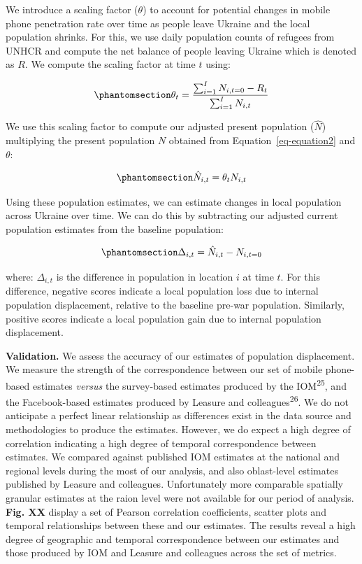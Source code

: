 \documentclass[
  11pt,
]{article}
\begin{document}
We introduce a scaling factor (\(\theta\)) to account for potential
changes in mobile phone penetration rate over time as people leave
Ukraine and the local population shrinks. For this, we use daily
population counts of refugees from UNHCR and compute the net balance of
people leaving Ukraine which is denoted as \(R\). We compute the scaling
factor at time \(t\) using:

\begin{equation}\phantomsection\label{eq-equation3}{ \theta_{t} = \frac{\sum_{i=1}^I N_{i,t=0} - R_{t}}{\sum_{i=1}^I N_{i,t}} }\end{equation}

We use this scaling factor to compute our adjusted present population
(\(\hat{N}\)) multiplying the present population \(N\) obtained from
Equation~\ref{eq-equation2} and \(\theta\):

\begin{equation}\phantomsection\label{eq-equation4}{ \hat{N}_{i,t} = \theta_{t} N_{i,t} }\end{equation}

Using these population estimates, we can estimate changes in local
population across Ukraine over time. We can do this by subtracting our
adjusted current population estimates from the baseline population:

\begin{equation}\phantomsection\label{eq-equation5}{ \Delta_{i,t} = \hat{N}_{i,t} - N_{i,t=0}}\end{equation}

where: \(\Delta_{i,t}\) is the difference in population in location
\(i\) at time \(t\). For this difference, negative scores indicate a
local population loss due to internal population displacement, relative
to the baseline pre-war population. Similarly, positive scores indicate
a local population gain due to internal population displacement.

\textbf{Validation.} We assess the accuracy of our estimates of
population displacement. We measure the strength of the correspondence
between our set of mobile phone-based estimates \emph{versus} the
survey-based estimates produced by the IOM\textsuperscript{25}, and the
Facebook-based estimates produced by Leasure and
colleagues\textsuperscript{26}. We do not anticipate a perfect linear
relationship as differences exist in the data source and methodologies
to produce the estimates. However, we do expect a high degree of
correlation indicating a high degree of temporal correspondence between
estimates. We compared against published IOM estimates at the national
and regional levels during the most of our analysis, and also
oblast-level estimates published by Leasure and colleagues.
Unfortunately more comparable spatially granular estimates at the raion
level were not available for our period of analysis. \textbf{Fig. XX}
display a set of Pearson correlation coefficients, scatter plots and
temporal relationships between these and our estimates. The results
reveal a high degree of geographic and temporal correspondence between
our estimates and those produced by IOM and Leasure and colleagues
across the set of metrics.
\end{document}
